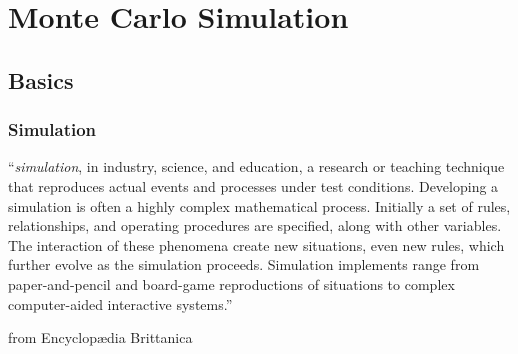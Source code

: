 
\section{Monte Carlo Simulation}
\subsection{Basics}

\begin{frame}[fragile]
\frametitle{Simulation}
``\emph{simulation},  in industry, science, and education, a research or
teaching technique that reproduces actual events and processes under test conditions.
Developing a simulation is often a highly complex mathematical process.
Initially a set of rules, relationships, and operating procedures are
specified, along with other variables. The interaction of these phenomena
create new situations, even new rules, which further evolve as the simulation
proceeds. Simulation implements range from paper-and-pencil and board-game
reproductions of situations to complex computer-aided interactive systems.''

from Encyclop{\ae}dia Brittanica
\end{frame}

